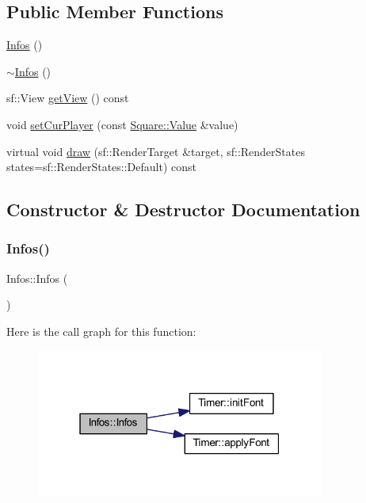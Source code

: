 \subsection*{Public Member Functions}
\begin{DoxyCompactItemize}
\item 
\hyperlink{class_infos_a0032935a2fbfcd006ffd71d90a74c4cf}{Infos} ()
\item 
\hyperlink{class_infos_a98973ef2400dabed724a65e1fe319f46}{$\sim$\+Infos} ()
\item 
sf\+::\+View \hyperlink{class_infos_af68a0d5dafcc767ae4b2b46ac8d7fbe2}{get\+View} () const
\item 
void \hyperlink{class_infos_a5dee8a8817c307c570db905429480d79}{set\+Cur\+Player} (const \hyperlink{class_square_a7feeec236c037a9849114226adaa4ecc}{Square\+::\+Value} \&value)
\item 
virtual void \hyperlink{class_infos_af7a440e4bc838e7b3251cbd20c7ad0ae}{draw} (sf\+::\+Render\+Target \&target, sf\+::\+Render\+States states=sf\+::\+Render\+States\+::\+Default) const
\end{DoxyCompactItemize}


\subsection{Constructor \& Destructor Documentation}
\mbox{\label{class_infos_a0032935a2fbfcd006ffd71d90a74c4cf}} 
\subsubsection{\texorpdfstring{Infos()}{Infos()}}
{\footnotesize\ttfamily Infos\+::\+Infos (\begin{DoxyParamCaption}{ }\end{DoxyParamCaption})}

Here is the call graph for this function\+:\nopagebreak
\begin{figure}[H]
\begin{center}
\leavevmode
\includegraphics[width=268pt]{class_infos_a0032935a2fbfcd006ffd71d90a74c4cf_cgraph}
\end{center}
\end{figure}
\mbox{\label{class_infos_a98973ef2400dabed724a65e1fe319f46}} 
